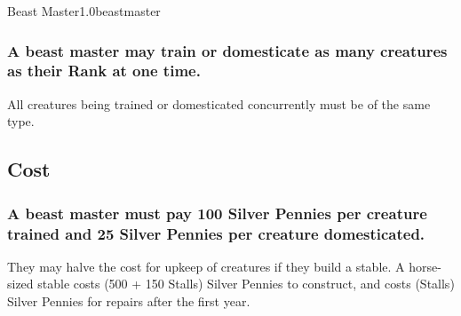 \begin{skill}{Beast Master}{1.0}{beastmaster}
\subsubsection{A beast master may train or domesticate as many creatures
as their Rank at one time.}

All creatures being trained or domesticated concurrently must be of
the same type.

\subsection{Cost}

\subsubsection{A beast master must pay 100 Silver Pennies per creature
trained and 25 Silver Pennies per creature domesticated.}

They may halve the cost for upkeep of creatures if they build a
stable.  A horse-sized stable costs (500 + 150 \x Stalls) Silver
Pennies to construct, and costs (Stalls) Silver Pennies for repairs
after the first year.

\end{skill}
